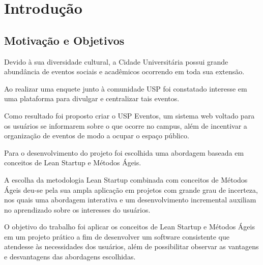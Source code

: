 \chapter{Introdução}
\label{cap:introducao}
\section{Motivação e Objetivos}

\par Devido à sua diversidade cultural, a Cidade Universitária possui grande abundância de eventos sociais e acadêmicos ocorrendo em toda sua extensão. 

\par Ao realizar uma enquete junto à comunidade USP foi constatado interesse em uma plataforma para divulgar e  centralizar tais eventos. 

\par Como resultado foi proposto criar o USP Eventos, um sistema web voltado para os usuários se informarem sobre o que ocorre no campus, além de incentivar a organização de eventos de modo a ocupar o espaço público.

\par Para o desenvolvimento do projeto foi escolhida uma abordagem baseada em conceitos de Lean Startup e Métodos Ágeis.

\par  A escolha da metodologia Lean Startup combinada com conceitos de Métodos Ágeis deu-se pela sua ampla aplicação em projetos com grande grau de incerteza, nos quais uma abordagem interativa e um desenvolvimento incremental auxiliam no aprendizado sobre os interesses do usuários.

\par O objetivo do trabalho foi aplicar os conceitos de Lean Startup e Métodos Ágeis em um projeto prático a fim de desenvolver um software consistente que atendesse às necessidades dos usuários, além de possibilitar observar as vantagens e desvantagens das abordagens escolhidas.
